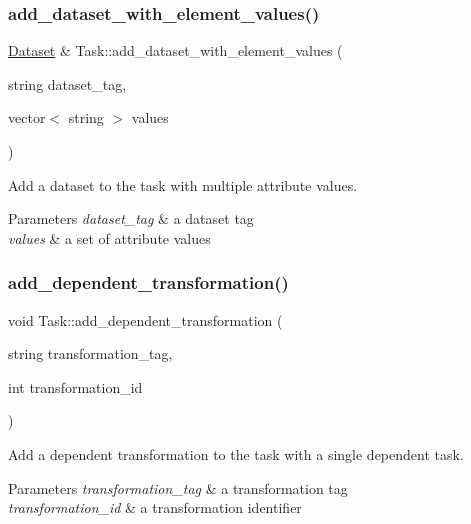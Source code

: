 \subsubsection{\texorpdfstring{add\+\_\+dataset\+\_\+with\+\_\+element\+\_\+values()}{add\_dataset\_with\_element\_values()}}
{\footnotesize\ttfamily \hyperlink{classDataset}{Dataset} \& Task\+::add\+\_\+dataset\+\_\+with\+\_\+element\+\_\+values (\begin{DoxyParamCaption}\item[{string}]{dataset\+\_\+tag,  }\item[{vector$<$ string $>$}]{values }\end{DoxyParamCaption})}

Add a dataset to the task with multiple attribute values. 
\begin{DoxyParams}{Parameters}
{\em dataset\+\_\+tag} & a dataset tag \\
\hline
{\em values} & a set of attribute values \\
\hline
\end{DoxyParams}
\mbox{\label{classTask_a5171db4ee3e3065b21fd8085debc5e7e}} 
\subsubsection{\texorpdfstring{add\+\_\+dependent\+\_\+transformation()}{add\_dependent\_transformation()}\hspace{0.1cm}{\footnotesize\ttfamily [1/2]}}
{\footnotesize\ttfamily void Task\+::add\+\_\+dependent\+\_\+transformation (\begin{DoxyParamCaption}\item[{string}]{transformation\+\_\+tag,  }\item[{int}]{transformation\+\_\+id }\end{DoxyParamCaption})}

Add a dependent transformation to the task with a single dependent task. 
\begin{DoxyParams}{Parameters}
{\em transformation\+\_\+tag} & a transformation tag \\
\hline
{\em transformation\+\_\+id} & a transformation identifier \\
\hline
\end{DoxyParams}
\mbox{\label{classTask_a839d94a0d3191d6f6ca7caf4a92c140b}} 
